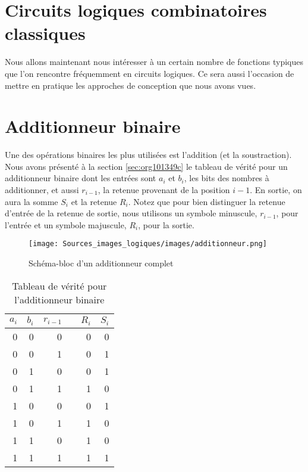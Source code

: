\documentclass[letter, oneside]{book}
\begin{document}
\section{Circuits logiques combinatoires classiques}
\label{sec:orge6e15b9}

Nous allons maintenant nous intéresser à un certain nombre de
fonctions typiques que l'on rencontre fréquemment en circuits
logiques. Ce sera aussi l'occasion de mettre en pratique les approches
de conception que nous avons vues.


\section{Additionneur binaire}
\label{sec:orgbd3fac8}

Une des opérations binaires les plus utilisées est l'addition (et la
soustraction). Nous avons présenté à la section \ref{sec:org101349c} le tableau de vérité pour un additionneur binaire dont les
entrées sont \(a_{i}\) et \(b_{i}\), les bits des nombres à
additionner, et aussi \(r_{i-1}\), la retenue provenant de la position
\(i-1\). En sortie, on aura la somme \(S_{i}\) et la retenue
\(R_{i}\). Notez que pour bien distinguer la retenue d'entrée de la
retenue de sortie, nous utilisons un symbole minuscule, \(r_{i-1}\),
pour l'entrée et un symbole majuscule, \(R_{i}\), pour la sortie. 

\begin{figure}[htbp]
\centering
\texttt{[image: Sources\_images\_logiques/images/additionneur.png]}
\caption{\label{fig:org7266a4c}Schéma-bloc d'un additionneur complet}
\end{figure}

\begin{table}[htbp]
\caption{\label{tab:orgccb1d56}Tableau de vérité pour l'additionneur binaire}
\centering
\begin{tabular}{rrrlrr}
\(a_{i}\) & \(b_{i}\) & \(r_{i-1}\) &  & \(R_{i}\) & \(S_{i}\)\\[0pt]
\hline
0 & 0 & 0 &  & 0 & 0\\[0pt]
0 & 0 & 1 &  & 0 & 1\\[0pt]
0 & 1 & 0 &  & 0 & 1\\[0pt]
0 & 1 & 1 &  & 1 & 0\\[0pt]
1 & 0 & 0 &  & 0 & 1\\[0pt]
1 & 0 & 1 &  & 1 & 0\\[0pt]
1 & 1 & 0 &  & 1 & 0\\[0pt]
1 & 1 & 1 &  & 1 & 1\\[0pt]
\end{tabular}
\end{table}
\end{document}
